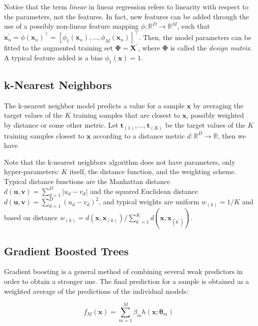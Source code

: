 \documentclass[a4paper,11pt]{kth-mag}
\begin{document}
Notice that the term \emph{linear} in linear regression refers to linearity with respect to the parameters, not the features. In fact, new features can be added through the use of a possibly non-linear feature mapping $\phi:\mathbb{R}^D\rightarrow\mathbb{R}^M$, such that $\bm x^\prime_n=\phi(\bm x_n)^\intercal=\left[\phi_1(\bm x_n),\ldots,\phi_M(\bm x_n)\right]^\intercal$. Then, the model parameters can be fitted to the augmented training set $\bm\Phi=\bm X^\prime$, where $\bm\Phi$ is called the \emph{design matrix}. A typical feature added is a bias $\phi_1(\bm x)=1$.

\subsection{k-Nearest Neighbors}
The k-nearest neighbor model \cite{knn} predicts a value for a sample $\bm x$ by averaging the target values of the $K$ training samples that are closest to $\bm x$, possibly weighted by distance or some other metric. Let $\bm t_{(1)},\ldots,\bm t_{(K)}$ be the target values of the $K$ training samples closest to $\bm x$ according to a distance metric $d:\mathbb{R}^D\rightarrow\mathbb{R}$, then we have



Note that the k-nearest neighbors algorithm does not have parameters, only hyper\hyp{}parameters: $K$ itself, the distance function, and the weighting scheme. Typical distance functions are the Manhattan distance $d(\bm u,\bm v)=\sum_{d=1}^D\vert u_d-v_d\vert$ and the squared Euclidean distance $d(\bm u,\bm v)=\sum_{d=1}^D(u_d-v_d)^2$, and typical weights are uniform $w_{(k)}=1/K$ and based on distance $w_{(k)}=d(\bm x,\bm x_{(k)})/\sum_{k^\prime=1}^K d(\bm x,\bm x_{(k^\prime)})$.

\subsection{Gradient Boosted Trees}
Gradient boosting \citep{gradientboosting} is a general method of combining several weak predictors in order to obtain a stronger one. The final prediction for a sample is obtained as a weighted average of the predictions of the individual models:

\begin{equation}
\label{eq:gboost}
f_M(\bm x)=\sum_{m=1}^M \beta_m h(\bm x;\bm\theta_m)
\end{equation}
\end{document}
